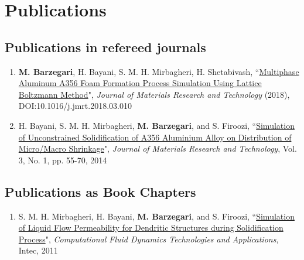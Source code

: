 \documentclass{cv}
\begin{document}

\section{Publications}

\subsection{Publications in refereed journals}
\begin{enumerate}
\item
\textbf{M. Barzegari}, H. Bayani, S. M. H. Mirbagheri, H. Shetabivash, ``\href{https://www.sciencedirect.com/science/article/pii/S2238785417303733}{Multiphase Aluminum A356 Foam Formation Process Simulation Using Lattice Boltzmann Method}", \textit{Journal of Materials Research and Technology} (2018), DOI:10.1016/j.jmrt.2018.03.010
\item
H. Bayani, S. M. H. Mirbagheri, \textbf{M. Barzegari}, and S. Firoozi, ``\href{http://www.sciencedirect.com/science/article/pii/S2238785413001129}{Simulation of Unconstrained Solidification of A356 Aluminium Alloy on Distribution of Micro/Macro Shrinkage}", \textit{Journal of Materials Research and Technology}, Vol. 3, No. 1, pp. 55-70, 2014
\end{enumerate}

\subsection{Publications as Book Chapters}

\begin{enumerate}
\item
S. M. H. Mirbagheri, H. Bayani, \textbf{M. Barzegari}, and S. Firoozi, ``\href{https://www.intechopen.com/books/computational-fluid-dynamics-technologies-and-applications/simulation-of-liquid-flow-permeability-for-dendritic-structures-during-solidification-process}{Simulation of Liquid Flow Permeability for Dendritic Structures during Solidification Process}", \textit{Computational Fluid Dynamics Technologies and Applications}, Intec, 2011
\end{enumerate}
\end{document}
